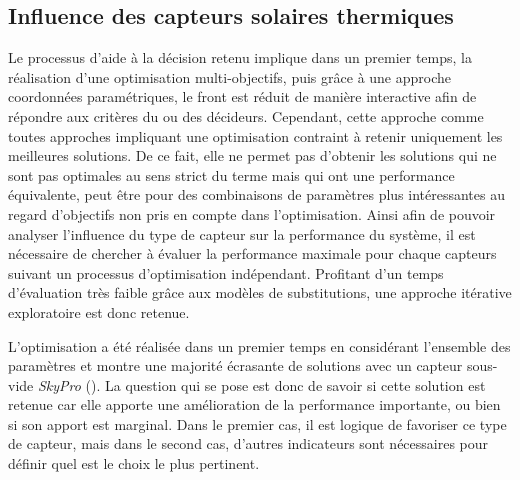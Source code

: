 



\subsection{Influence des capteurs solaires thermiques} %
\label{sub:influence_des_capteurs_solaires_thermiques}
Le processus d’aide à la décision retenu implique dans un premier temps, la réalisation
d’une optimisation multi-objectifs, puis grâce à une approche coordonnées paramétriques,
le front est réduit de manière interactive afin de répondre aux critères du ou des
décideurs. Cependant, cette approche comme toutes approches impliquant une optimisation
contraint à retenir uniquement les meilleures solutions. De ce fait, elle ne permet pas
d’obtenir les solutions qui ne sont pas optimales au sens strict du terme mais qui ont
une performance équivalente, peut être pour des combinaisons de paramètres plus
intéressantes au regard d’objectifs non pris en compte dans l’optimisation. Ainsi afin de
pouvoir analyser l’influence du type de capteur sur la performance du système, il est
nécessaire de chercher à évaluer la performance maximale pour chaque capteurs suivant un
processus d’optimisation indépendant. Profitant d’un temps d’évaluation très faible grâce
aux modèles de substitutions, une approche itérative exploratoire est donc retenue.

L’optimisation a été réalisée dans un premier temps en considérant l’ensemble
des paramètres et montre une majorité écrasante de solutions avec un capteur
sous-vide \textit{SkyPro} (). La question qui se pose
est donc de savoir si cette solution est retenue car elle apporte une amélioration de la
performance importante, ou bien si son apport est marginal. Dans le premier cas, il est
logique de favoriser ce type de capteur, mais dans le second cas, d’autres indicateurs
sont nécessaires pour définir quel est le choix le plus pertinent.

